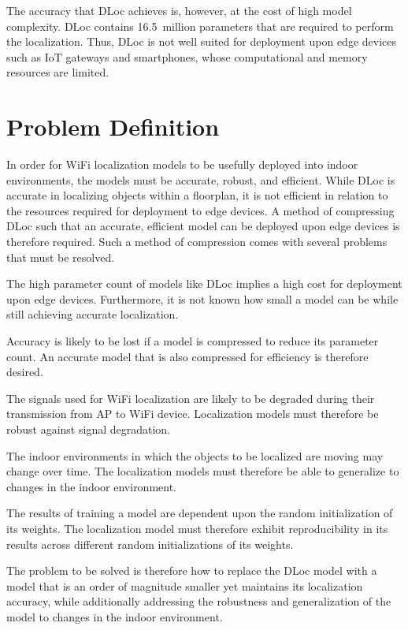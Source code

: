 The accuracy that DLoc achieves is, however, at the cost of high model complexity. DLoc contains
16.5~million parameters that are required to perform the localization. Thus, DLoc is not well suited
for deployment upon edge devices such as IoT gateways and smartphones, whose computational and memory
resources are limited.

\section{Problem Definition}
\label{sec:intro:problem}

In order for WiFi localization models to be usefully deployed into indoor environments, the models must
be accurate, robust, and efficient. While DLoc is accurate in localizing objects within a floorplan, it
is not efficient in relation to the resources required for deployment to edge devices. A method of
compressing DLoc such that an accurate, efficient model can be deployed upon edge devices is therefore
required. Such a method of compression comes with several problems that must be resolved.

The high parameter count of models like DLoc implies a high cost for deployment upon edge devices.
Furthermore, it is not known how small a model can be while still achieving accurate localization.

Accuracy is likely to be lost if a model is compressed to reduce its parameter count. An accurate model
that is also compressed for efficiency is therefore desired.

The signals used for WiFi localization are likely to be degraded during their transmission from AP to
WiFi device. Localization models must therefore be robust against signal degradation.

The indoor environments in which the objects to be localized are moving may change over time. The
localization models must therefore be able to generalize to changes in the indoor environment.

The results of training a model are dependent upon the random initialization of its weights. The
localization model must therefore exhibit reproducibility in its results across different random
initializations of its weights.

The problem to be solved is therefore how to replace the DLoc model with a model that is an order of
magnitude smaller yet maintains its localization accuracy, while additionally addressing the robustness
and generalization of the model to changes in the indoor environment.

